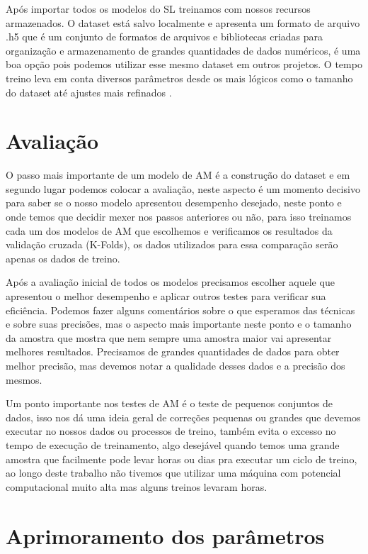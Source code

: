 Após importar todos os modelos do SL treinamos com nossos recursos armazenados. O dataset está salvo localmente e apresenta um formato de arquivo .h5 que é um conjunto de formatos de arquivos e bibliotecas criadas para organização e armazenamento de grandes quantidades de dados numéricos, é uma boa opção pois podemos utilizar esse mesmo dataset em outros projetos. O tempo treino leva em conta diversos parâmetros desde os mais lógicos como o tamanho do dataset até ajustes mais refinados \cite{astroml}. 

\section{Avaliação} 

O passo mais importante de um modelo de AM é a construção do dataset e em segundo lugar podemos colocar a avaliação, neste aspecto é um momento decisivo para saber se o nosso modelo apresentou desempenho desejado, neste ponto e onde temos que decidir mexer nos passos anteriores ou não, para isso treinamos cada um dos modelos de AM que escolhemos e verificamos os resultados da validação cruzada (K-Folds), os dados utilizados para essa comparação serão apenas os dados de treino. 

Após a avaliação inicial de todos os modelos precisamos escolher aquele que apresentou o melhor desempenho e aplicar outros testes para verificar sua eficiência. Podemos fazer alguns comentários sobre o que esperamos das técnicas e sobre suas precisões, mas o aspecto mais importante neste ponto e o tamanho da amostra que mostra que nem sempre uma amostra maior vai apresentar melhores resultados. Precisamos de grandes quantidades de dados para obter melhor precisão, mas devemos notar a qualidade desses dados e a precisão dos mesmos. 

Um ponto importante nos testes de AM é o teste de pequenos conjuntos de dados, isso nos dá uma ideia geral de correções pequenas ou grandes que devemos executar no nossos dados ou processos de treino, também evita o excesso no tempo de execução de treinamento, algo desejável quando temos uma grande amostra que facilmente pode levar horas ou dias pra executar um ciclo de treino, ao longo deste trabalho não tivemos que utilizar uma máquina com potencial computacional muito alta mas alguns treinos levaram horas. 

\section{Aprimoramento dos parâmetros}

